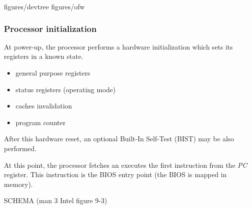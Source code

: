 %
%
%
%
%
%

%
%

%


		{figures/devtree}
		{figures/ofw}

%
%

\begin{frame}
  \frametitle{Processor initialization}

  At power-up, the processor performs a hardware initialization which sets its registers in a known state.

  \-

  \begin{itemize}
  \item general purpose registers
  \item status registers (operating mode)
  \item caches invalidation
  \item program counter
  \end{itemize}

  \-

  After this hardware reset, an optional Built-In Self-Test (BIST) may be also performed.

  \-

  At this point, the processor fetches an executes the first instruction from the {\em PC} register. This instruction is the BIOS entry point (the BIOS is mapped in memory).

  \-

  SCHEMA (man 3 Intel figure 9-3)

\end{frame}

%
%
%

